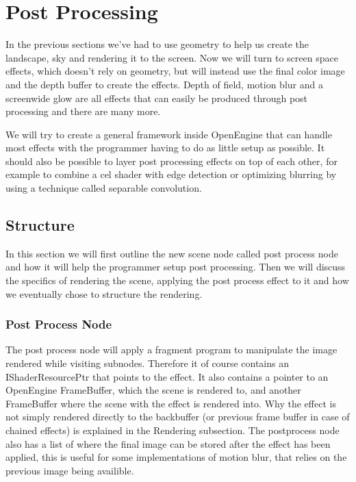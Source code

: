 \chapter{Post Processing}


In the previous sections we've had to use geometry to help us create
the landscape, sky and rendering it to the screen. Now we will turn to
screen space effects, which doesn't rely on geometry, but will instead
use the final color image and the depth buffer to create the
effects. Depth of field, motion blur and a screenwide glow are all
effects that can easily be produced through post processing and there
are many more.


We will try to create a general framework inside OpenEngine that can
handle most effects with the programmer having to do as little setup
as possible. It should also be possible to layer post processing
effects on top of each other, for example to combine a cel shader with
edge detection or optimizing blurring by using a technique called
separable convolution.

\section{Structure}

In this section we will first outline the new scene node called post
process node and how it will help the programmer setup post
processing. Then we will discuss the specifics of rendering the scene,
applying the post process effect to it and how we eventually chose to
structure the rendering.

\subsection*{Post Process Node}

The post process node will apply a fragment program to manipulate the
image rendered while visiting subnodes. Therefore it of course
contains an IShaderResourcePtr that points to the effect. It also
contains a pointer to an OpenEngine FrameBuffer, which the scene is
rendered to, and another FrameBuffer where the scene with the effect
is rendered into. Why the effect is not simply rendered directly to
the backbuffer (or previous frame buffer in case of chained effects)
is explained in the Rendering subsection. The postprocess node also
has a list of  where the final image can be stored
after the effect has been applied, this is useful for some
implementations of motion blur, that relies on the previous image
being availible.

